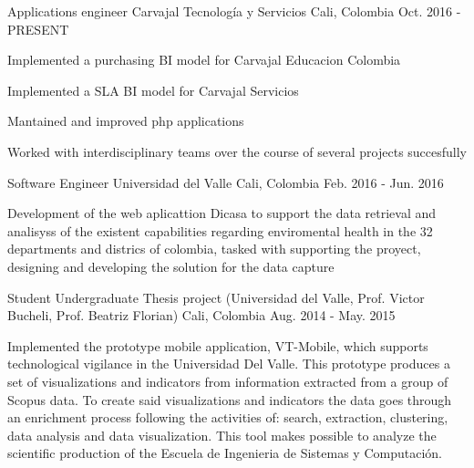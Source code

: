 

\begin{cventries}

  \cventry
    {Applications engineer} %
    {Carvajal Tecnología y Servicios} %
    {Cali, Colombia} %
    {Oct. 2016 - PRESENT} %
    {
      \begin{cvitems} %
        \item {Implemented a purchasing BI model for Carvajal Educacion Colombia}
        \item {Implemented a SLA BI model for Carvajal Servicios}
        \item {Mantained and improved php applications}
        \item {Worked with interdisciplinary teams over the course of several projects succesfully}
      \end{cvitems}
    }

  \cventry
    {Software Engineer} %
    {Universidad del Valle} %
    {Cali, Colombia} %
    {Feb. 2016 -  Jun. 2016} %
    {
      \begin{cvitems} %
        \item {Development of the web aplicattion Dicasa to support the data retrieval and analisyss of the existent capabilities regarding enviromental health in the 32 departments and districs of colombia, tasked with supporting the proyect, designing and developing the solution for the data capture}
      \end{cvitems}
    }

  \cventry
    {Student} %
    {Undergraduate Thesis project (Universidad del Valle, Prof. Victor Bucheli, Prof. Beatriz Florian) } %
    {Cali, Colombia} %
    {Aug. 2014 -  May. 2015} %
    {
      \begin{cvitems} %
        \item {Implemented the prototype mobile application, VT-Mobile, which supports technological vigilance in the Universidad Del Valle. This prototype produces a set of visualizations and indicators from information extracted from a group of Scopus data. To create said visualizations and indicators the data goes through an enrichment process following the activities of: search, extraction, clustering, data analysis and data visualization. This tool makes possible to analyze the scientific production of the Escuela de Ingenieria de Sistemas y Computación.}
      \end{cvitems}
    }


\end{cventries}
